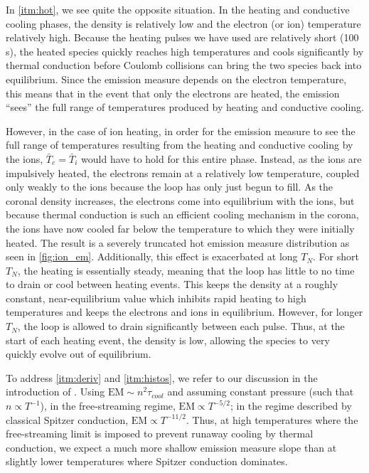 \documentclass[apj]{emulateapj}
\begin{document}
	\par In \autoref{itm:hot}, we see quite the opposite situation. In the heating and conductive cooling phases, the density is relatively low and the electron (or ion) temperature relatively high. Because the heating pulses we have used are relatively short (100 s), the heated species quickly reaches high temperatures and cools significantly by thermal conduction before Coulomb collisions can bring the two species back into equilibrium. Since the emission measure depends on the electron temperature, this means that in the event that only the electrons are heated, the emission  ``sees'' the full range of temperatures produced by heating and conductive cooling. 
	\par However, in the case of ion heating, in order for the emission measure to see the full range of temperatures resulting from the heating and conductive cooling by the ions, $\bar{T}_e=\bar{T}_i$ would have to hold for this entire phase. Instead, as the ions are impulsively heated, the electrons remain at a relatively low temperature, coupled only weakly to the ions because the loop has only just begun to fill. As the coronal density increases, the electrons come into equilibrium with the ions, but because thermal conduction is such an efficient cooling mechanism in the corona, the ions have now cooled far below the temperature to which they were initially heated. The result is a severely truncated hot emission measure distribution as seen in \autoref{fig:ion_em}. Additionally, this effect is exacerbated at long $T_N$. For short $T_N$, the heating is essentially steady, meaning that the loop has little to no time to drain or cool between heating events. This keeps the density at a roughly constant, near-equilibrium value which inhibits rapid heating to high temperatures and keeps the electrons and ions in equilibrium. However, for longer $T_N$, the loop is allowed to drain significantly between each pulse. Thus, at the start of each heating event, the density is low, allowing the species to very quickly evolve out of equilibrium. 
	\par To address \autoref{itm:deriv} and \autoref{itm:histos}, we refer to our discussion in the introduction of . Using $\mathrm{EM}\sim n^2\tau_{cool}$ and assuming constant pressure (such that $n\propto T^{-1}$), in the free-streaming regime, $\mathrm{EM}\propto T^{-5/2}$; in the regime described by classical Spitzer conduction, $\mathrm{EM}\propto T^{-11/2}$. Thus, at high temperatures where the free-streaming limit is imposed to prevent runaway cooling by thermal conduction, we expect a much more shallow emission measure slope than at slightly lower temperatures where Spitzer conduction dominates.
\end{document}

